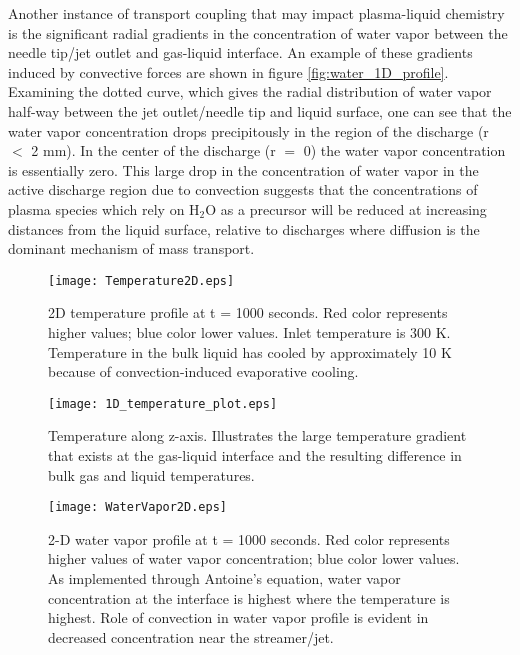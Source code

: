 \documentclass[12pt]{article}
\begin{document}
Another instance of transport coupling that may impact plasma-liquid chemistry is the significant radial gradients in the concentration of water vapor between the needle tip/jet outlet and gas-liquid interface. An example of these gradients induced by convective forces are shown in figure \ref{fig:water_1D_profile}. Examining the dotted curve, which gives the radial distribution of water vapor half-way between the jet outlet/needle tip and liquid surface, one can see that the water vapor concentration drops precipitously in the region of the discharge (r $<$ 2 mm). In the center of the discharge (r $=$ 0) the water vapor concentration is essentially zero. This large drop in the concentration of water vapor in the active discharge region due to convection suggests that the concentrations of plasma species which rely on H$_2$O as a precursor will be reduced at increasing distances from the liquid surface, relative to  discharges where diffusion is the dominant mechanism of mass transport.

\begin{figure}[htb]
    \centering
        \texttt{[image: Temperature2D.eps]}
        \caption{2D temperature profile at t = 1000 seconds. Red color represents higher values; blue color lower values. Inlet temperature is 300 K. Temperature in the bulk liquid has cooled by approximately 10 K because of convection-induced evaporative cooling.}
        \label{fig:temp_2D_profile}
\end{figure}

\begin{figure}[htb]
    \centering
        \texttt{[image: 1D\_temperature\_plot.eps]}
        \caption{Temperature along z-axis. Illustrates the large temperature gradient that exists at the gas-liquid interface and the resulting difference in bulk gas and liquid temperatures.}
        \label{fig:temp_1D_profile}
\end{figure}

\begin{figure}[htb]
    \centering
        \texttt{[image: WaterVapor2D.eps]}
        \caption{2-D water vapor profile at t = 1000 seconds. Red color represents higher values of water vapor concentration; blue color lower values. As implemented through Antoine's equation, water vapor concentration at the interface is highest where the temperature is highest. Role of convection in water vapor profile is evident in decreased concentration near the streamer/jet.}
        \label{fig:water_2D_profile}
\end{figure}
\end{document}
